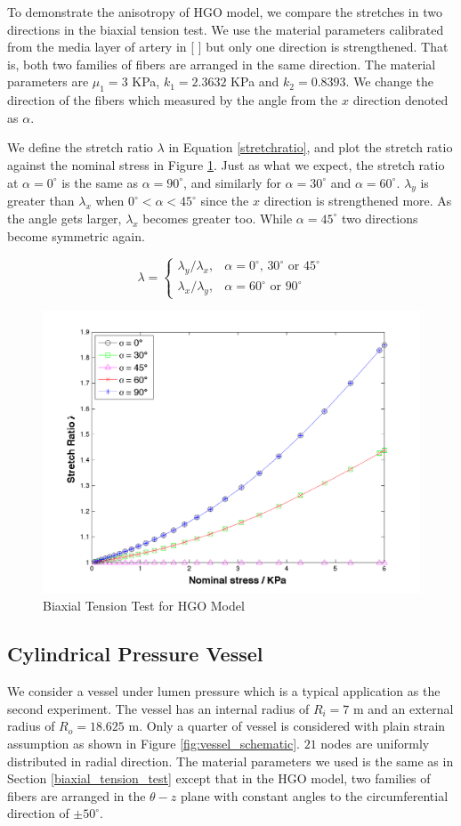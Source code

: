 To demonstrate the anisotropy of HGO model, we compare the stretches in two directions in the biaxial tension test. We use the material parameters calibrated from the media layer of artery in [ ] but only one direction is strengthened. That is, both two families of fibers are arranged in the same direction. The material parameters are $\mu_1 = 3$ KPa, $k_1 = 2.3632$ KPa and $k_2 = 0.8393$. We change the direction of the fibers which measured by the angle from the $x$ direction denoted as $\alpha$. 

We define the stretch ratio $\lambda$ in Equation \ref{stretchratio}, and plot the stretch ratio against the nominal stress in Figure \ref{fig:biaxial2}. Just as what we expect, the stretch ratio at $\alpha = 0^\circ$ is the same as $\alpha = 90^\circ$, and similarly for $\alpha = 30^\circ$ and $\alpha = 60^\circ$. 
$\lambda_y$ is greater than $\lambda_x$ when $0^\circ < \alpha < 45^\circ$ since the $x$ direction is strengthened more. As the angle gets larger, $\lambda_x$ becomes greater too. While $\alpha = 45^\circ$ two directions become symmetric again.

\begin{equation}
\label{stretchratio}
\lambda = 
\begin{cases}
	\lambda_y/\lambda_x, & \text{$\alpha = 0^\circ$, $30^\circ$ or $45^\circ$} \\
	\lambda_x/\lambda_y, & \text{$\alpha = 60^\circ$ or $90^\circ$}
\end{cases}
\end{equation}
 
\begin{figure}[h!]
\centering
\includegraphics[width=.6\textwidth]{./figures/biaxial2.png}
\caption{Biaxial Tension Test for HGO Model}
\label{fig:biaxial2}
\end{figure}

\subsection{Cylindrical Pressure Vessel}
\label{pressure_vessel}
We consider a vessel under lumen pressure which is a typical application as the second experiment. The vessel has an internal radius of $R_i = 7$ m and an external radius of $R_o = 18.625$ m. Only a quarter of vessel is considered with plain strain assumption as shown in Figure \ref{fig:vessel_schematic}. $21$ nodes are uniformly distributed in radial direction. The material parameters we used is the same as in Section \ref{biaxial_tension_test} except that in the HGO model, two families of fibers are arranged in the $\theta-z$ plane with constant angles to the circumferential direction of $\pm 50^\circ$. 

